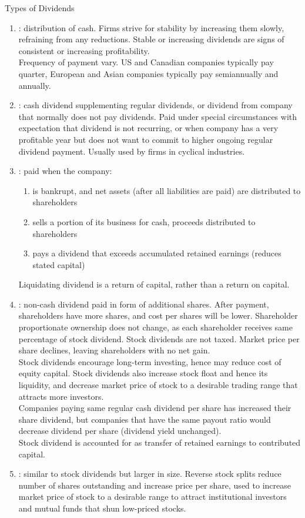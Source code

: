 \begin{remark} Types of Dividends
\begin{enumerate}[label=\roman*.]
\setlength{\itemsep}{0pt}
\item {}: distribution of cash. Firms strive for stability by increasing them slowly, refraining from any reductions. Stable or increasing dividends are signs of consistent or increasing profitability.\\
Frequency of payment vary. US and Canadian companies typically pay quarter, European and Asian companies typically pay semiannually and annually.
\item {}: cash dividend supplementing regular dividends, or dividend from company that normally does not pay dividends. Paid under special circumstances with expectation that dividend is not recurring, or when company has a very profitable year but does not want to commit to higher ongoing regular dividend payment. Usually used by firms in cyclical industries.
\item {}: paid when the company:
\begin{enumerate}[label=\arabic*.]
\setlength{\itemsep}{0pt}
\item is bankrupt, and net assets (after all liabilities are paid) are distributed to shareholders
\item sells a portion of its business for cash, proceeds distributed to shareholders
\item pays a dividend that exceeds accumulated retained earnings (reduces stated capital)
\end{enumerate}
Liquidating dividend is a return of capital, rather than a return on capital.
\item {}: non-cash dividend paid in form of additional shares. After payment, shareholders have more shares, and cost per shares will be lower. Shareholder proportionate ownership does not change, as each shareholder receives same percentage of stock dividend. Stock dividends are not taxed. Market price per share declines, leaving shareholders with no net gain.\\
Stock dividends encourage long-term investing, hence may reduce cost of equity capital. Stock dividends also increase stock float and hence its liquidity, and decrease market price of stock to a desirable trading range that attracts more investors.\\
Companies paying same regular cash dividend per share has increased their share dividend, but companies that have the same payout ratio would decrease dividend per share (dividend yield unchanged).\\
Stock dividend is accounted for as transfer of retained earnings to contributed capital.
\item {}: similar to stock dividends but larger in size. Reverse stock splits reduce number of shares outstanding and increase price per share, used to increase market price of stock to a desirable range to attract institutional investors and mutual funds that shun low-priced stocks.
\end{enumerate}
\end{remark}

